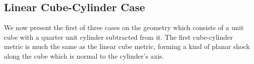 \documentclass[3p,times,procedia,number]{elsarticle}
\begin{document}

\subsection{Linear Cube-Cylinder Case}

We now present the first of three cases on the geometry
which consists of a unit cube with a quarter unit cylinder
subtracted from it.
The first cube-cylinder metric is much the same as the
linear cube metric, forming a kind of planar shock along
the cube which is normal to the cylinder's axis.
\end{document}
